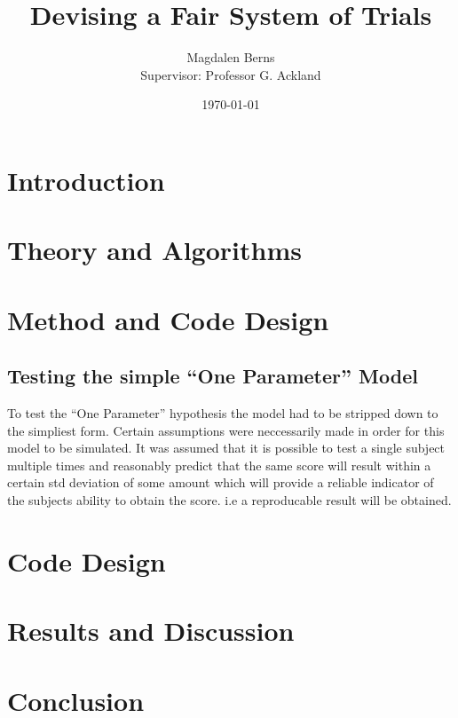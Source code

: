 \documentclass[12pt]{article}
\title{Devising a Fair System of Trials}
\author{Magdalen Berns \\
	Supervisor: Professor G. Ackland}
\date{\today}
\begin{document}
\maketitle
\thispagestyle{empty}

\begin{abstract}
\noindent

\end{abstract}

\clearpage
\tableofcontents
\thispagestyle{empty}
\clearpage
\section{Introduction}
\section{Theory and Algorithms}
\section{Method and Code Design}
\subsection{Testing the simple \enquote{One Parameter} Model}
To test the \enquote{One Parameter} hypothesis the model had to be stripped down to the simpliest form.
Certain assumptions were neccessarily made in order for this model to be simulated. It was assumed that it is possible
to test a single subject multiple times and reasonably predict that the same score will result within a certain std deviation
 of some amount which will provide a reliable indicator
of the subjects ability to obtain the score. i.e a reproducable result will be obtained.


\section{Code Design}
\section{Results and Discussion}
\section{Conclusion}


\end{document}
